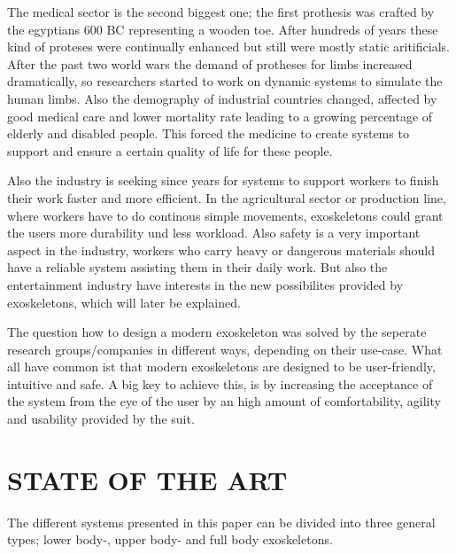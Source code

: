 \documentclass[letterpaper, 10 pt, conference]{ieeeconf}  %
\begin{document}

The medical sector is the second biggest one; the first prothesis was crafted by the egyptians 600 BC representing a wooden toe. After hundreds of years these kind of proteses were continually enhanced but still were mostly static aritificials. After the past two world wars the demand of protheses for limbs increased dramatically, so researchers started to work on dynamic systems to simulate the human limbs. Also the demography of industrial countries changed, affected by good medical care and lower mortality rate leading to a growing percentage of elderly and disabled people. This forced the medicine to create systems to support and ensure a certain quality of life  for these people.


Also the industry is seeking since years for systems to support workers to finish their work faster and more efficient. In the agricultural sector or production line, where workers have to do continous simple movements, exoskeletons could grant the users more durability und less workload. Also safety is a very important aspect in the industry, workers who carry heavy or dangerous materials should have a reliable system assisting them in their daily work. 
But also the entertainment industry have interests in the new possibilites provided by exoskeletons, which will later be explained.


The question how to design a modern exoskeleton was solved by the seperate research groups/companies in different ways, depending on their use-case. What all have common ist that modern exoskeletons are designed to be user-friendly, intuitive and safe. A big key to achieve this, is by increasing the acceptance of the system from the eye of the user by  an high amount of comfortability, agility and usability provided by the suit. 



\section{STATE OF THE ART}

The different systems presented in this paper can be divided into three general types; lower body-, upper body- and full body exoskeletons.
\end{document}
